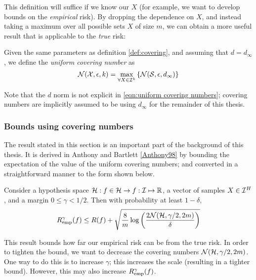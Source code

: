 This definition will suffice if we know our $X$ (for example, we want
to develop bounds on the \emph{empirical} risk).  By dropping the dependence
on $X$, and instead taking a maximum over all possible sets $X$
of size $m$, we can obtain a more useful result that is applicable to the
\emph{true} risk:

\begin{definition}
Given the same parameters as definition \ref{def:covering}, and
assuming that $d = d_{\infty}$, we define
the \emph{uniform covering number} as
\begin{equation}
\label{eqn:uniform covering numbers}
\mathcal{N}({\mathcal{X}}, {\epsilon}, {k}) = \max_{\forall X \in \mathcal{I}^k} \left\{
\mathcal{N}({\mathcal{S}}, {\epsilon}, {d_{\infty}}) \right\} 
\end{equation}
\end{definition}

Note that the $d$ norm is not explicit in \ref{eqn:uniform covering
numbers}; covering numbers are implicitly assumed to be using
$d_{\infty}$ for the remainder of this thesis.

\subsubsection{Bounds using covering numbers}
\label{sec:covering number bounds}

The result stated in this section is an important part of the
background of this thesis.  It is derived in Anthony and Bartlett
\ref{Anthony98} by bounding the expectation of the value of the
uniform covering numbers; and converted in a straightforward manner to
the form shown below.

\begin{theorem}
Consider a hypothesis space $\mathcal{H} : f \in \mathcal{H} \rightarrow f : \mathcal{I}
\mapsto \mathbb{R}$, a vector of samples $X \in \mathcal{I}^H$, and a margin
$0 \leq \gamma < 1/2$.  Then with probability at least $1 - \delta$, 
\begin{equation}
R_{\mathrm{emp}}^{\gamma}(f) \leq R(f) + \sqrt{\frac{8}{m} \log \left( \frac{2
\mathcal{N}({\mathcal{H}}, {\gamma/2}, {2m})}{\delta} \right)}
\end{equation}
\end{theorem}

This result bounds how far our empirical risk can be from the true
risk.  In order to tighten the bound, we want to decrease the covering
numbers $\mathcal{N}({\mathcal{H}}, {\gamma/2}, {2m})$.  One way to do this is to
increase  $\gamma$; this increases the scale (resulting in a tighter
bound).  However, this may also increase $R_{\mathrm{emp}}^{\gamma}(f)$.

